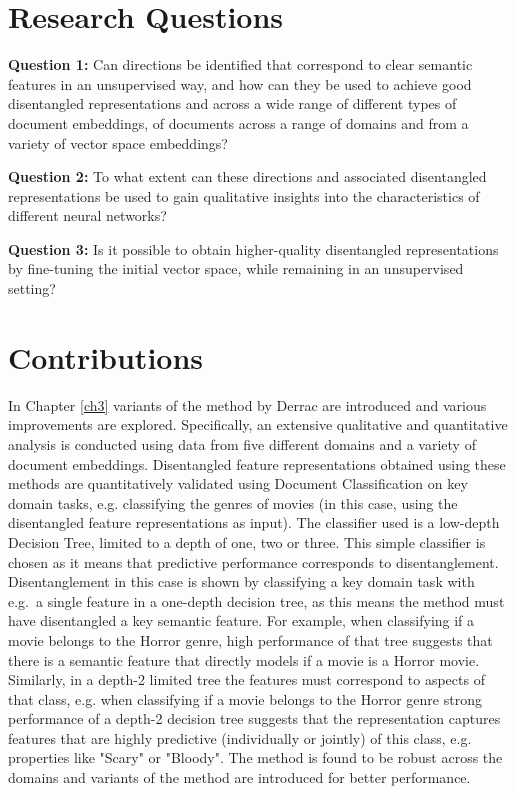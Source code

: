 \section{Research Questions}

\textbf{Question 1:} Can directions be identified that correspond to clear semantic features in an unsupervised way, and how can they be used to achieve good disentangled representations and across a wide range of different types of document embeddings,  of documents across a range of domains and from a variety of vector space embeddings?

\textbf{Question 2:} To what extent can these directions and associated disentangled representations be used to gain qualitative insights into the characteristics of different neural networks?

\textbf{Question 3:} Is it possible to obtain higher-quality disentangled representations by fine-tuning the initial vector space, while remaining in an unsupervised setting?

\section{Contributions}

In Chapter \ref{ch3} variants of the method by Derrac \cite{Derrac2015} are introduced and various improvements are explored. Specifically, an extensive qualitative and quantitative analysis is conducted using data from five different domains and a variety of document embeddings. Disentangled feature representations obtained using these methods are quantitatively validated using Document Classification on key domain tasks, e.g. classifying the genres of movies (in this case, using the disentangled feature representations as input). The classifier used is a low-depth Decision Tree, limited to a depth of one, two or three. This simple classifier is chosen as it means that predictive performance corresponds to disentanglement. Disentanglement in this case is shown by classifying a key domain task with e.g.\ a single feature in a one-depth decision tree, as this means the method must have disentangled a key semantic feature. For example, when classifying if a movie belongs to the Horror genre,  high performance of that tree suggests that there is a semantic feature that directly models if a movie is a Horror movie. Similarly, in a depth-2 limited tree the features must correspond to aspects of that class, e.g. when classifying if a movie belongs to the Horror genre strong performance of a depth-2 decision tree suggests that the representation captures features that are highly predictive (individually or jointly) of this class, e.g. properties like "Scary" or "Bloody". The method is found to be robust across the domains and variants of the method are introduced for better performance.

